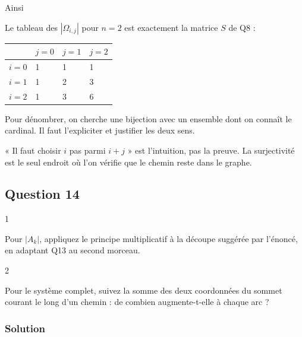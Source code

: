 \documentclass[11pt,a4paper]{article}
\newcommand{\equationajustee}[1]{%
  \sbox{\boiteequation}{$\displaystyle #1$}%
  \ifdim\wd\boiteequation>\linewidth
    \[\resizebox{\linewidth}{!}{\usebox{\boiteequation}}\]%
  \else
    \[#1\]%
  \fi}
\begin{document}
Ainsi
\equationajustee{\boxed{\forall(i,j)\in[\![0,n]\!]^2,\quad|\Omega_{i,j}|=\binom{i+j}i.}}

Le tableau des \(|\Omega_{i,j}|\) pour \(n=2\) est exactement la matrice \(S\) de Q8 :

\begin{longtable}[]{@{}llll@{}}
\toprule\noalign{}
& \(j=0\) & \(j=1\) & \(j=2\) \\
\midrule\noalign{}
\endhead
\bottomrule\noalign{}
\endlastfoot
\(i=0\) & 1 & 1 & 1 \\
\(i=1\) & 1 & 2 & 3 \\
\(i=2\) & 1 & 3 & 6 \\
\end{longtable}

\begin{methode}

Pour dénombrer, on cherche une bijection avec un ensemble dont on connaît le cardinal. Il faut l'expliciter et justifier les deux sens.

\end{methode}

\begin{piege}

« Il faut choisir \(i\) pas parmi \(i+j\) » est l'intuition, pas la preuve. La surjectivité est le seul endroit où l'on vérifie que le chemin reste dans le graphe.

\end{piege}

\hypertarget{question-14}{%
\subsection{Question 14}\label{question-14}}

\begin{indication}{1}

Pour \(|A_k|\), appliquez le principe multiplicatif à la découpe suggérée par l'énoncé, en adaptant Q13 au second morceau.

\end{indication}

\begin{indication}{2}

Pour le système complet, suivez la somme des deux coordonnées du sommet courant le long d'un chemin : de combien augmente-t-elle à chaque arc ?

\end{indication}

\hypertarget{solution-13}{%
\subsubsection{Solution}\label{solution-13}}
\end{document}
